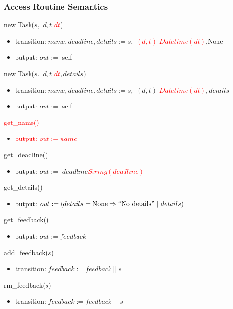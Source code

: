 \documentclass[12pt, titlepage]{article}
\begin{document}
\subsubsection*{Access Routine Semantics}
\noindent new Task($s,$ \sout{$d, t$} \textcolor{red}{$dt$})
\begin{itemize}
    \item transition: $name, deadline, details := s,$ \textcolor{red}{\sout{$(d, t)$} $Datetime(dt)$}$, \text{None}$
    \item output: $out :=$ self
\end{itemize}

\noindent new Task($s,$ \sout{$d, t$} \textcolor{red}{$dt$}$, details$)
\begin{itemize}
    \item transition: $name, deadline, details := s,$ \sout{$(d, t)$} \textcolor{red}{$Datetime(dt)$}$, details$
    \item output: $out :=$ self
\end{itemize}

\noindent \textcolor{red}{get\_name()}
\begin{itemize}
    \item \textcolor{red}{output: $out := name$}
\end{itemize}

\noindent get\_deadline()
\begin{itemize}
    \item output: $out :=$ \sout{$deadline$}\textcolor{red}{$String(deadline)$}
\end{itemize}

\noindent get\_details()
\begin{itemize}
    \item output: $out := (details = \text{None} \Rightarrow ``\text{No details}"\ |\ details)$
\end{itemize}

\noindent get\_feedback()
\begin{itemize}
    \item output: $out := feedback$
\end{itemize}

\noindent add\_feedback($s$)
\begin{itemize}
    \item transition: $feedback := feedback\ ||\ s$
\end{itemize}
\newpage

\noindent rm\_feedback($s$)
\begin{itemize}
    \item transition: $feedback := feedback - s$
\end{itemize}
\end{document}

